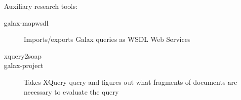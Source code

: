 Auxiliary research tools:
\begin{description}
\item[galax-mapwsdl]Imports/exports Galax queries as WSDL Web Services
\item[xquery2soap]

\item[galax-project] Takes XQuery query and figures out what fragments of
                documents are necessary to evaluate the query
\end{description}

